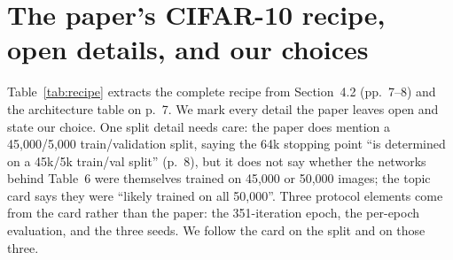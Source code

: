 \documentclass[11pt,a4paper]{article}
\begin{document}
\section{The paper's CIFAR-10 recipe, open details, and our choices}

Table~\ref{tab:recipe} extracts the complete recipe from Section~4.2 (pp.~7--8) and the architecture table on p.~7. We mark every detail the paper leaves open and state our choice. One split detail needs care: the paper does mention a 45{,}000/5{,}000 train/validation split, saying the 64k stopping point ``is determined on a 45k/5k train/val split'' (p.~8), but it does not say whether the networks behind Table~6 were themselves trained on 45{,}000 or 50{,}000 images; the topic card says they were ``likely trained on all 50,000''. Three protocol elements come from the card rather than the paper: the 351-iteration epoch, the per-epoch evaluation, and the three seeds. We follow the card on the split and on those three.
\end{document}
